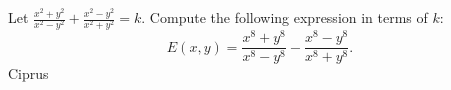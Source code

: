 Let $\frac{x^2+y^2}{x^2-y^2} + \frac{x^2-y^2}{x^2+y^2} = k$. Compute the following expression in terms of $k$:\[ E(x,y) = \frac{x^8 + y^8}{x^8-y^8} - \frac{ x^8-y^8}{x^8+y^8}.  \]Ciprus
